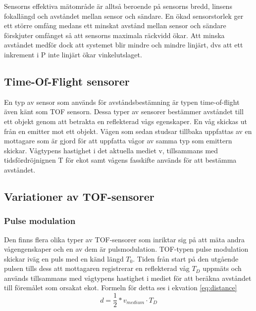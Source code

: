 \documentclass[a4paper,12pt,fleqn]{article}
\begin{document}
Sensorns effektiva mätområde är alltså beroende på sensorns bredd, linsens fokallängd och avståndet mellan sensor och sändare.
En ökad sensorstorlek ger ett större omfång medans ett minskat avstånd mellan sensor och sändare förskjuter omfånget så att sensorns maximala räckvidd ökar. Att minska avståndet medför dock att systemet blir mindre och mindre linjärt, dvs att ett inkrement i P inte linjärt ökar vinkelutslaget.

\subsection{Time-Of-Flight sensorer}
En typ av sensor som används för avståndsbestämning är typen time-of-flight även känt som TOF sensorn. Dessa typer av sensorer bestämmer avståndet till ett objekt genom att betrakta en reflekterad vågs egenskaper. 
En våg skickas ut från en emitter mot ett objekt. Vågen som sedan studsar tillbaka uppfattas av en mottagare som är gjord för att uppfatta vågor av samma typ som emittern skickar. Vågtypens hastighet i det aktuella mediet v, tillsammans med tidsfördröjnignen T för ekot samt vågens fasskifte används för att bestämma avståndet.



\subsection{Variationer av TOF-sensorer}

\subsubsection{Pulse modulation}
Den finns flera olika typer av TOF-sensorer som inriktar sig på att mäta andra vågengenskaper och en av dem är pulsmodulation.
TOF-typen pulse modulation skickar iväg en puls med en känd längd \begin{math}T_{0}\end{math}. Tiden från start på den utgående pulsen tills dess att mottagaren registrerar en reflekterad våg \begin{math}T_{D}\end{math} uppmäts och används tillsammans med vågtypens hastighet i mediet för att beräkna avståndet till föremålet som orsakat ekot. Formeln för detta ses i ekvation \ref{eq:distance}
\begin{equation}
\label{eq:distance}
d = \frac{1}{2}*v_{medium} \cdot T_D
\end{equation}
\end{document}
